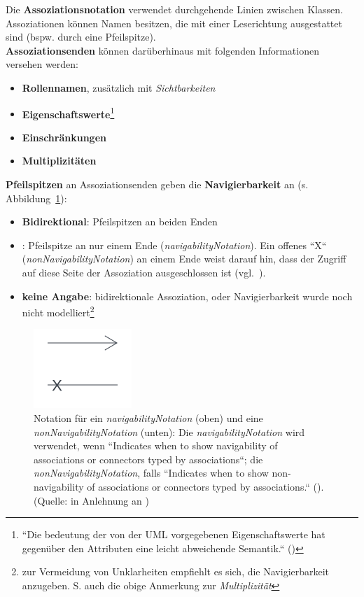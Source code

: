 \noindent
Die \textbf{Assoziationsnotation} verwendet durchgehende Linien zwischen Klassen.\\

\noindent
Assoziationen können Namen besitzen, die mit einer Leserichtung ausgestattet sind (bspw. durch eine Pfeilspitze).\\

\noindent
\textbf{Assoziationsenden} können darüberhinaus mit folgenden Informationen versehen werden:

\begin{itemize}
    \item \textbf{Rollennamen}, zusätzlich mit \textit{Sichtbarkeiten}
    \item \textbf{Eigenschaftswerte}\footnote{
    ``Die bedeutung der von der UML vorgegebenen Eigenschaftswerte hat gegenüber den Attributen eine leicht abweichende Semantik.`` (\cite[20]{Buh09})
    }
    \item \textbf{Einschränkungen}
    \item \textbf{Multiplizitäten}
\end{itemize}

\noindent
\textbf{Pfeilspitzen} an Assoziationsenden geben die \textbf{Navigierbarkeit} an (s. Abbildung~\ref{fig:navigability}):

\begin{itemize}
    \item \textbf{Bidirektional}: Pfeilspitzen an beiden Enden
    \item {}: Pfeilspitze an nur einem Ende (\textit{navigabilityNotation}).
    Ein offenes ``X`` (\textit{nonNavigabilityNotation}) an einem Ende weist darauf hin, dass der Zugriff auf diese Seite der Assoziation ausgeschlossen ist (vgl.~\cite[719]{OMG17}).
    \item \textbf{keine Angabe}: bidirektionale Assoziation, oder Navigierbarkeit wurde noch nicht modelliert\footnote{
     zur Vermeidung von Unklarheiten empfiehlt es sich, die Navigierbarkeit anzugeben. S. auch die obige Anmerkung zur \textit{Multiplizität}
    }
\end{itemize}

\begin{figure}
    \centering
    \includegraphics[scale=0.5]{part three/Klassendiagramme/img/navigability}
    \caption{Notation für ein \textit{navigabilityNotation} (oben) und eine \textit{nonNavigabilityNotation} (unten): Die \textit{navigabilityNotation} wird verwendet, wenn ``Indicates when to show navigability of associations or connectors typed by associations``; die \textit{nonNavigabilityNotation}, falls ``Indicates when to show non-navigability of associations or connectors typed by associations.`` (\cite[731]{OMG17}). (Quelle: in Anlehnung an \cite[719]{OMG17})}
    \label{fig:navigability}
\end{figure}

